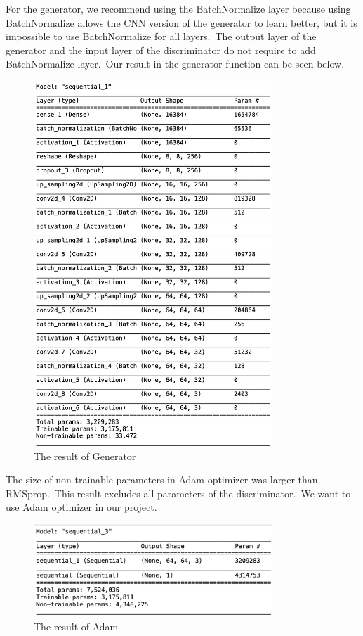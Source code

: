 \documentclass[conference]{IEEEtran}
\begin{document}
    For the generator, we recommend using the BatchNormalize layer because using BatchNormalize allows the CNN version of the generator to learn better, but it is impossible to use BatchNormalize for all layers.\ The output layer of the generator and the input layer of the discriminator do not require to add BatchNormalize layer.\ Our result in the generator function can be seen below.

    \begin{figure}
        \caption{The result of Generator}
        \label{fig:generator}
        \includegraphics[width=9cm]{generator.png}
    \end{figure}

    The size of non-trainable parameters in Adam optimizer was larger than RMSprop.\ This result excludes all parameters of the discriminator.\ We want to use Adam optimizer in our project.

    \begin{figure}
        \caption{The result of Adam}
        \label{fig:adam}
        \includegraphics[width=9cm]{Adam.png}
    \end{figure}
\end{document}
